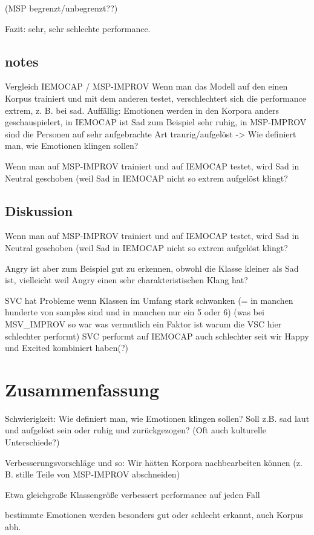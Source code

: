 \documentclass{article} %
\begin{document}
(MSP begrenzt/unbegrenzt??)

Fazit: sehr, sehr schlechte performance. 

\subsection{notes}

Vergleich IEMOCAP / MSP-IMPROV
Wenn man das Modell auf den einen Korpus trainiert und mit dem anderen testet, verschlechtert sich die performance extrem, z. B. bei sad. Auffällig: Emotionen werden in den Korpora anders geschauspielert, in IEMOCAP ist Sad zum Beispiel sehr ruhig, in MSP-IMPROV sind die Personen auf sehr aufgebrachte Art traurig/aufgelöst
-> Wie definiert man, wie Emotionen klingen sollen?

Wenn man auf MSP-IMPROV trainiert und auf IEMOCAP testet, wird Sad in Neutral geschoben (weil Sad in IEMOCAP nicht so extrem aufgelöst klingt?

\subsection{Diskussion}

Wenn man auf MSP-IMPROV trainiert und auf IEMOCAP testet, wird Sad in Neutral geschoben (weil Sad in IEMOCAP nicht so extrem aufgelöst klingt?

Angry ist aber zum Beispiel gut zu erkennen, obwohl die Klasse kleiner als Sad ist, vielleicht weil Angry einen sehr charakteristischen Klang hat?

SVC hat Probleme wenn Klassen im Umfang stark schwanken (= in manchen hunderte von samples sind und in manchen nur ein 5 oder 6) (was bei MSV_IMPROV so war was vermutlich ein Faktor ist warum die VSC hier schlechter performt)
SVC performt auf IEMOCAP auch schlechter seit wir Happy und Excited kombiniert haben(?)

\section{Zusammenfassung}

Schwierigkeit: Wie definiert man, wie Emotionen klingen sollen? Soll z.B. sad laut und aufgelöst sein oder ruhig und zurückgezogen? (Oft auch kulturelle Unterschiede?)

Verbesserungsvorschläge und so: Wir hätten Korpora nachbearbeiten können (z. B. stille Teile von MSP-IMPROV abschneiden)

Etwa gleichgroße Klassengröße verbessert performance auf jeden Fall

bestimmte Emotionen werden besonders gut oder schlecht erkannt, auch Korpus abh.

\pagebreak
\tableofcontents
\pagebreak


\end{document}
